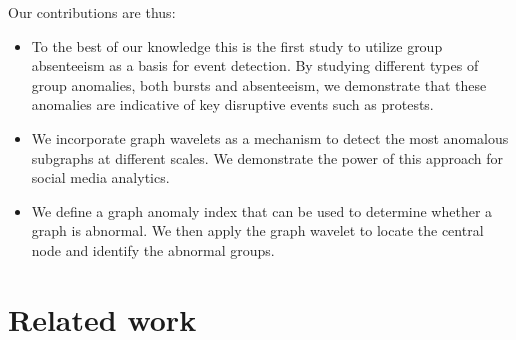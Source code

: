 Our contributions are thus:
\begin{itemize}
\item To the best of our knowledge this is the first study to utilize group absenteeism as a basis for event detection. By studying different types of group anomalies, both bursts and absenteeism, we demonstrate that these anomalies are indicative of key disruptive events such as protests.
\item We incorporate graph wavelets as a mechanism to detect the most anomalous subgraphs at different scales. We demonstrate the power of this approach for social media analytics.
\item We define a graph anomaly index that can be used to determine whether a graph is abnormal. We then apply the graph wavelet to locate the central node and identify the abnormal groups.
\end{itemize}




\section{Related work} \label{sec:related}
